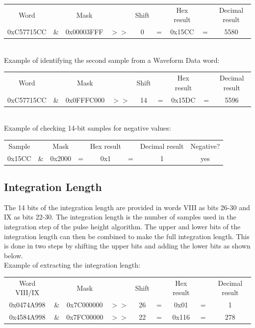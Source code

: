 \documentclass[letterpaper,12pt,notitlepage]{report}
\begin{document}
\begin{tabular}{ccccccccc}
Word &  & Mask & & Shift & & Hex result & & Decimal result\\
0xC57715CC & \& & 0x00003FFF & $>>$ & 0 & = & 0x15CC & = & 5580\\
\end{tabular}\\

Example of identifying the second sample from a Waveform Data word:\\

\begin{tabular}{ccccccccc}
Word &  & Mask & & Shift & & Hex result & & Decimal result\\
0xC57715CC & \& & 0x0FFFC000 & $>>$ & 14 & = & 0x15DC & = & 5596\\
\end{tabular}\\

Example of checking 14-bit samples for negative values:

\begin{tabular}{cccccccc}
Sample & & Mask & & Hex result & & Decimal result & Negative?\\
0x15CC & \& & 0x2000 & = & 0x1 & = & 1 & yes\\
\end{tabular}

\subsection{Integration Length}
The 14 bits of the integration length are provided in words VIII as bits 26-30 and IX as bits 22-30. The integration length is the number of samples used in the integration step of the pulse height algorithm. The upper and lower bits of the integration length can then be combined to make the full integration length. This is done in two steps by shifting the upper bits and adding the lower bits as shown below.\\

Example of extracting the integration length:\\

\begin{tabular}{ccccccccc}
Word VIII/IX &  & Mask & & Shift & & Hex result & & Decimal result\\
0x0474A998 & \& & 0x7C000000 & $>>$ & 26 & = & 0x01 & = & 1\\
0x4584A998 & \& & 0x7FC00000 & $>>$ & 22 & = & 0x116 & = & 278\\
\end{tabular}\\
\end{document}
